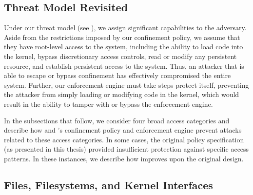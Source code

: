 \subsection{Threat Model Revisited}


Under our threat model (see ), we assign significant capabilities
to the adversary. Aside from the restrictions imposed by our confinement policy, we assume
that they have root-level access to the system, including the ability to load code into
the kernel, bypass discretionary access controls, read or modify any persistent resource,
and establish persistent access to the system. Thus, an attacker that is able to escape or
bypass confinement has effectively compromised the entire system. Further, our enforcement
engine must take steps protect itself, preventing the attacker from simply loading or
modifying code in the kernel, which would result in the ability to tamper with or bypass
the enforcement engine.

In the subsections that follow, we consider four broad access categories and describe how
\bpfbox{} and \bpfcontain{}'s confinement policy and enforcement engine prevent attacks
related to these access categories. In some cases, the original \bpfbox{} policy
specification (as presented in this thesis) provided insufficient protection against
specific access patterns. In these instances, we describe how \bpfcontain{} improves upon
the original \bpfbox{} design.

\subsection{Files, Filesystems, and Kernel Interfaces}

